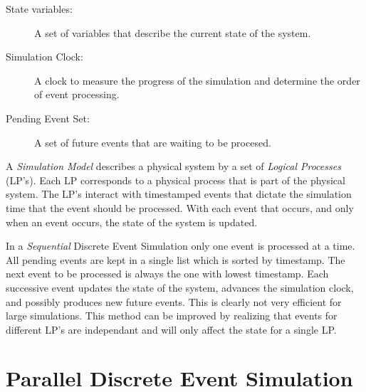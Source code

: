\documentclass[11pt]{book}
\begin{document}
\begin{description}

  \item[State variables: ] A set of variables that describe the current state of the system.
  \item[Simulation Clock: ] A clock to measure the progress of the simulation and determine the order of event processing.
  \item[Pending Event Set: ] A set of future events that are waiting to be procesed.

\end{description}

\noindent
A \emph{Simulation Model} describes a physical system by a set of \emph{Logical Processes} (LP's).
Each LP corresponds to a physical process that is part of the physical system. The LP's interact
with timestamped events that dictate the simulation time that the event should be processed.
With each event that occurs, and only when an event occurs, the state of the system is updated.

In a \emph{Sequential} Discrete Event Simulation only one event is processed at a time. All pending
events are kept in a single list which is sorted by timestamp. The next event to be processed is
always the one with lowest timestamp. Each successive event updates the state of the system,
advances the simulation clock, and possibly produces new future events. This is clearly not very
efficient for large simulations. This method can be improved by realizing that events for
different LP's are independant and will only affect the state for a single LP.


\section{Parallel Discrete Event Simulation}
\end{document}
